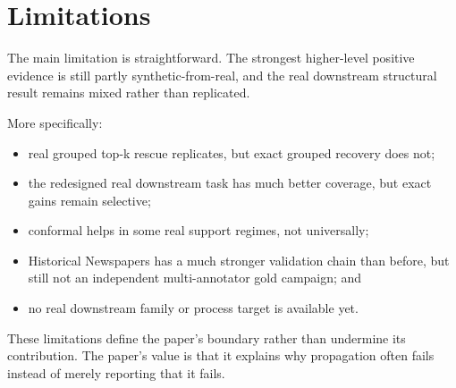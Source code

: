 \section{Limitations}

The main limitation is straightforward. The strongest higher-level positive evidence is still partly synthetic-from-real, and the real downstream structural result remains mixed rather than replicated.

More specifically:

\begin{itemize}
\item real grouped top-k rescue replicates, but exact grouped recovery does not;
\item the redesigned real downstream task has much better coverage, but exact gains remain selective;
\item conformal helps in some real support regimes, not universally;
\item Historical Newspapers has a much stronger validation chain than before, but still not an independent multi-annotator gold campaign; and
\item no real downstream family or process target is available yet.
\end{itemize}

These limitations define the paper's boundary rather than undermine its contribution. The paper's value is that it explains why propagation often fails instead of merely reporting that it fails.
